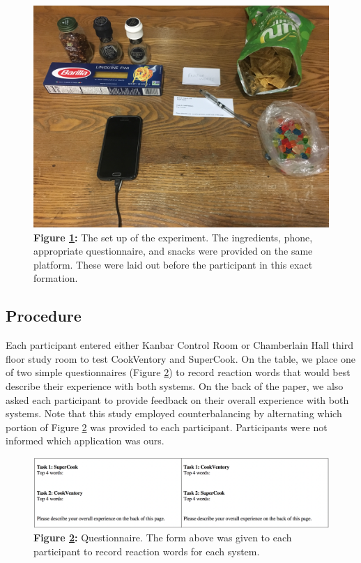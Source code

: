 \documentclass{sigchi}
\begin{document}
\begin{figure}[htb!]
\centering
	\includegraphics[width=0.8\columnwidth]{setup.jpg}\\
	\textbf{Figure \ref{fig:setup}:} The set up of the experiment. The ingredients, phone, appropriate questionnaire, and snacks were provided on the same platform. These were laid out before the participant in this exact formation.
	\label{fig:setup}
\end{figure}

\subsection{Procedure}
	 Each participant entered either Kanbar Control Room or Chamberlain Hall third floor study room to test CookVentory and SuperCook. On the table, we place one of two simple questionnaires (Figure \ref{fig:counterbalancing}) to record reaction words that would best describe their experience with both systems. On the back of the paper, we also asked each participant to provide feedback on their overall experience with both systems. Note that this study employed counterbalancing by alternating which portion of Figure \ref{fig:counterbalancing} was provided to each participant. Participants were not informed which application was ours.

\begin{figure}[htb!]
\centering
	\includegraphics[width=0.8\columnwidth]{counterbalancing.png}\\
	\textbf{Figure \ref{fig:counterbalancing}:} Questionnaire. The form above was given to each participant to record reaction words for each system.
	\label{fig:counterbalancing}
\end{figure}
\end{document}
